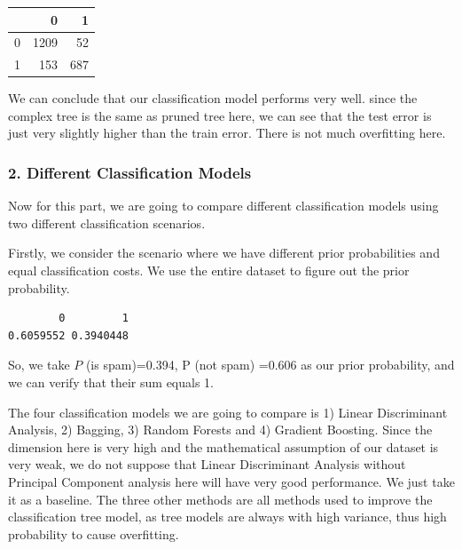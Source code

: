 \documentclass[
  11pt,
]{article}
\newenvironment{Shaded}{\begin{snugshade}}{\end{snugshade}}
\newcommand{\AttributeTok}[1]{\textcolor[rgb]{0.77,0.63,0.00}{#1}}
\newcommand{\CommentTok}[1]{\textcolor[rgb]{0.56,0.35,0.01}{\textit{#1}}}
\newcommand{\DecValTok}[1]{\textcolor[rgb]{0.00,0.00,0.81}{#1}}
\newcommand{\FunctionTok}[1]{\textcolor[rgb]{0.00,0.00,0.00}{#1}}
\newcommand{\NormalTok}[1]{#1}
\newcommand{\OtherTok}[1]{\textcolor[rgb]{0.56,0.35,0.01}{#1}}
\newcommand{\SpecialCharTok}[1]{\textcolor[rgb]{0.00,0.00,0.00}{#1}}
\begin{document}
\begin{tabular}[t]{l|r|r}
\hline
  & 0 & 1\\
\hline
0 & 1209 & 52\\
\hline
1 & 153 & 687\\
\hline
\end{tabular}

We can conclude that our classification model performs very well. since the complex tree is the same as pruned tree here, we can see that the test error is just very slightly higher than the train error. There is not much overfitting here.

\hypertarget{different-classification-models}{%
\subsubsection{2. Different Classification Models}\label{different-classification-models}}

Now for this part, we are going to compare different classification models using two different classification scenarios.

Firstly, we consider the scenario where we have different prior probabilities and equal classification costs. We use the entire dataset to figure out the prior probability.

\begin{Shaded}
\end{Shaded}

\begin{verbatim}
        0         1 
0.6059552 0.3940448 
\end{verbatim}

So, we take \(P\) (is spam)=0.394, P (not spam) =0.606 as our prior probability, and we can verify that their sum equals 1.

The four classification models we are going to compare is 1) Linear Discriminant Analysis, 2) Bagging, 3) Random Forests and 4) Gradient Boosting. Since the dimension here is very high and the mathematical assumption of our dataset is very weak, we do not suppose that Linear Discriminant Analysis without Principal Component analysis here will have very good performance. We just take it as a baseline. The three other methods are all methods used to improve the classification tree model, as tree models are always with high variance, thus high probability to cause overfitting.
\end{document}

